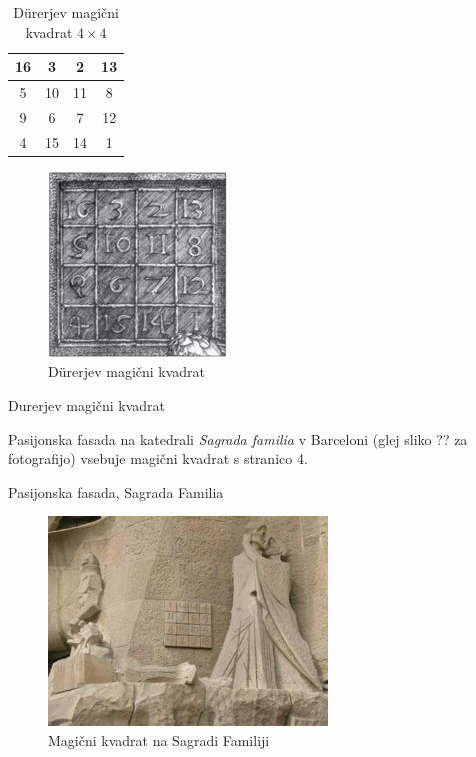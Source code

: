 \documentclass[a4paper,12pt]{article}
\begin{document}
\begin{table}[!h]
\centering
\caption{D\"{u}rerjev magični kvadrat $4 \times 4$}
\vspace{2mm}
\label{durex}
\begin{tabular}{|c|c|c|c|}
\hline
16 &  3 &  2 & 13 \\ \hline
 5 & 10 & 11 &  8 \\ \hline
 9 &  6 &  7 & 12 \\ \hline
4 & 15 & 14 &  1 \\ \hline
\end{tabular}
\end{table}

\begin{figure}[!h]
\centering
\caption{D\"{u}rerjev magični kvadrat}
\vspace{2mm}
\label{durer}
\includegraphics[scale = 1.3]{durer.jpg}

\end{figure}

Durerjev magični kvadrat

Pasijonska fasada na katedrali \emph{Sagrada familia} v Barceloni (glej sliko
?? za fotografijo) vsebuje magični kvadrat s stranico 4.

Pasijonska fasada, Sagrada Familia

\begin{figure}[!h]
\centering
\caption{Magični kvadrat na Sagradi Familiji}
\vspace{2mm}
\label{familia}
\includegraphics[scale = 0.8]{sagrada.jpg}
\end{figure}
\end{document}
